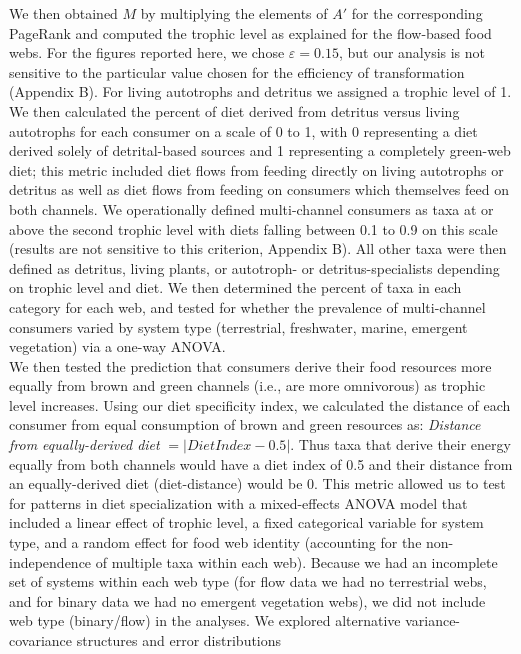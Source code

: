 \documentclass[12pt,a4paper,oneside]{article}
\begin{document}
We then obtained \(M\) by multiplying the elements of \(A'\) for the corresponding PageRank and computed the trophic level as explained for the
flow-based food webs. For the figures reported here, we chose
\(\varepsilon=0.15\), but our analysis is not sensitive to the
particular value chosen for the efficiency of transformation (Appendix
B). For living autotrophs and detritus we
assigned a trophic level of 1. We then calculated the percent of diet
derived from detritus versus living autotrophs for each consumer on a scale
of 0 to 1, with 0 representing a diet derived solely of detrital-based
sources and 1 representing a completely green-web diet; this metric
included diet flows from feeding directly on living
autotrophs or detritus as well as diet flows from feeding on consumers
which themselves feed on both channels. We
operationally defined multi-channel consumers as taxa at or above the
second trophic level with diets falling between 0.1 to 0.9 on this
scale (results are not sensitive to this criterion, Appendix B). All
other taxa were then defined as detritus, living plants, or 
autotroph- or detritus-specialists depending on trophic level and
diet. We then determined the percent of taxa in each category for each
web, and tested for whether the prevalence of multi-channel consumers
varied by system type (terrestrial, freshwater, marine, emergent
vegetation) via a one-way ANOVA.
\\
\indent We then tested the prediction that consumers derive their food resources more
equally from brown and green channels
(i.e., are more omnivorous) as trophic level
increases. Using our diet specificity index, we
calculated the distance of 
each consumer from equal consumption of brown and green resources as:
\emph{Distance from equally-derived diet} \(= |Diet Index-0.5|\). Thus taxa
that derive their energy equally from both channels would have
a diet index of 0.5 and their distance from an equally-derived diet
(diet-distance) would be 0. This metric allowed us to test for
patterns in diet specialization
with a mixed-effects ANOVA model that included a linear effect of
trophic level, a fixed categorical variable for system type, 
and a random effect for food web identity (accounting for the non-independence of multiple taxa within each web). Because we had an
incomplete set of systems within each
web type (for flow data we had no terrestrial webs, and for binary data
we had no emergent vegetation webs), we did not include web type
(binary/flow) in the analyses. We explored alternative
variance-covariance structures and error distributions
\end{document}
